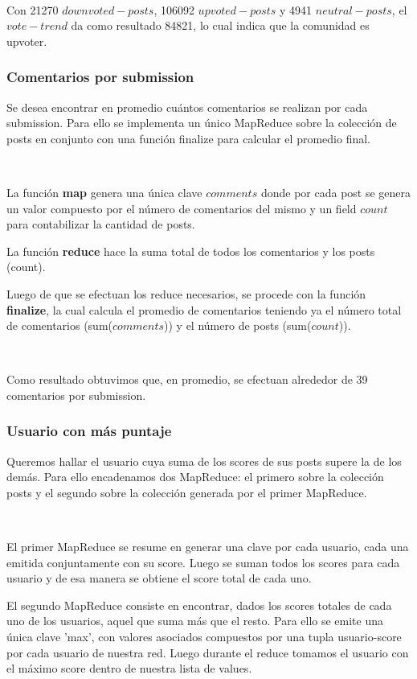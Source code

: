 ~

Con 21270 $downvoted-posts$, 106092 $upvoted-posts$ y 4941 $neutral-posts$, el $vote-trend$ da como resultado 84821, lo cual indica que la comunidad es upvoter.

\subsubsection{Comentarios por submission}

Se desea encontrar en promedio cuántos comentarios se realizan por cada submission. Para ello se implementa un único MapReduce sobre la colección de posts en conjunto con una función finalize para calcular el promedio final.

~

La función \textbf{map} genera una única clave $comments$ donde por cada post se genera un valor compuesto por el número de comentarios del mismo y un field $count$ para contabilizar la cantidad de posts.


La función \textbf{reduce} hace la suma total de todos los comentarios y los posts (count).


Luego de que se efectuan los reduce necesarios, se procede con la función \textbf{finalize}, la cual calcula el promedio de comentarios teniendo ya el número total de comentarios (sum($comments$)) y el número de posts (sum($count$)).

~

Como resultado obtuvimos que, en promedio, se efectuan alrededor de 39 comentarios por submission.

\subsubsection{Usuario con más puntaje}

Queremos hallar el usuario cuya suma de los scores de sus posts supere la de los demás. Para ello encadenamos dos MapReduce: el primero sobre la colección posts y el segundo sobre la colección generada por el primer MapReduce.

~

El primer MapReduce se resume en generar una clave por cada usuario, cada una emitida conjuntamente con su score. Luego se suman todos los scores para cada usuario y de esa manera se obtiene el score total de cada uno.

El segundo MapReduce consiste en encontrar, dados los scores totales de cada uno de los usuarios, aquel que suma más que el resto. Para ello se emite una única clave 'max', con valores asociados compuestos por una tupla usuario-score por cada usuario de nuestra red. Luego durante el reduce tomamos el usuario con el máximo score dentro de nuestra lista de values. 

